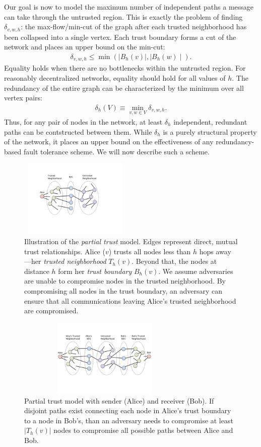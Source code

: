 \documentclass{sig-alternate-05-2015}
\newcommand{\beq}{\begin{eqnarray}}
\newcommand{\eeq}{\end{eqnarray}}
\begin{document}
Our goal is now to model the maximum number of independent paths a message
can take through the untrusted region.
This is exactly the problem of finding $\delta_{v,w,h}$: the max-flow/min-cut of
the graph after each trusted neighborhood has been
collapsed into a single vertex.
Each trust boundary forms a cut of the network and places an upper bound on the
min-cut:
\beq
\delta_{v,w,h} \leq \min\left( \mid B_h(v) \mid, \mid B_h(w) \mid \right).
\eeq
Equality holds when there are no bottlenecks within the untrusted region.
For reasonably decentralized networks, equality should hold for all
values of $h$.
The redundancy of the entire graph can be characterized by the minimum over
all vertex pairs:
\beq
\delta_h(V) \equiv \min_{v,w \in V} \delta_{v,w,h}.
\eeq
Thus, for any pair of nodes in the network, at least $\delta_h$ independent,
redundant paths can be contstructed between them.
While $\delta_h$ is a purely structural property of the network,
it places an upper bound on the effectiveness of any
redundancy-based fault tolerance scheme.
We will now describe such a scheme.

\begin{figure}
\centerline{\includegraphics[width=2.12in,height=1.46in]{fig-alice_trusted_neigh2}}
\caption{
Illustration of the {\em partial trust} model.
Edges represent direct, mutual trust relationships.
Alice ($v$) trusts all nodes less than
$h$ hops away---her {\em trusted neighborhood} $T_h(v)$.
Beyond that, the nodes at distance $h$ form her {\em trust boundary} $B_h(v)$.
We assume adversaries are unable to compromise nodes in the trusted neighborhood.
By compromising all nodes in the trust boundary, an adversary can ensure that
all communications leaving Alice's trusted neighborhood are compromised.
}
\label{fig:trust-source}
\end{figure}

\begin{figure}
\centerline{\includegraphics[width=3.33in,height=1.46in]{fig-bob_Alice_trusted_neigh2}}
\caption{
Partial trust model with sender (Alice) and receiver (Bob).
If disjoint paths exist connecting each node in Alice's trust boundary to
a node in Bob's,
than an adversary needs to compromise at least $|T_h(v)|$ nodes to
compromise all possible paths between Alice and Bob.
}
\label{fig:trust-source-destionation}
\end{figure}
\end{document}

